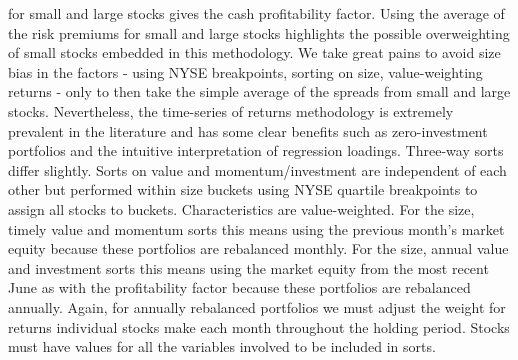 for small and large stocks gives the cash profitability factor. Using the average of the
risk premiums for small and large stocks highlights the possible overweighting of small
stocks embedded in this methodology. We take great pains to avoid size bias in the factors
- using NYSE breakpoints, sorting on size, value-weighting returns - only to then take the
simple average of the spreads from small and large stocks. Nevertheless, the time-series
of returns methodology is extremely prevalent in the literature and has some clear
benefits such as zero-investment portfolios and the intuitive interpretation of regression
loadings. Three-way sorts differ slightly. Sorts on value and momentum/investment are
independent of each other but performed within size buckets using NYSE quartile
breakpoints to assign all stocks to buckets. Characteristics are value-weighted. For the
size, timely value and momentum sorts this means using the previous month’s market equity
because these portfolios are rebalanced monthly. For the size, annual value and investment
sorts this means using the market equity from the most recent June as with the
profitability factor because these portfolios are rebalanced annually. Again, for annually
rebalanced portfolios we must adjust the weight for returns individual stocks make each
month throughout the holding period. Stocks must have values for all the variables
involved to be included in sorts.
